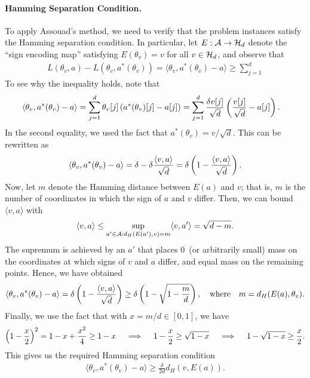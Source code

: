 \documentclass[12pt]{article}
\begin{document}
\paragraph{Hamming Separation Condition.} To apply Assouad's method, we need to verify that the problem instances satisfy the Hamming separation condition. In particular, let $E:{\cal A} \to {\cal H}_d$ denote the ``sign encoding map'' satisfying $E(\theta_v) = v$ for all $v \in {\cal H}_d$, and observe that 
\begin{align}
L(\theta_v, a) - L(\theta_v, a^*(\theta_v)) = \langle \theta_v, a^*(\theta_v) - a \rangle \geq \sum_{j=1}^d 
\end{align}
To see why the inequality holds, note that 
\begin{align}
\langle \theta_v, a^*(\theta_v) - a \rangle &= \sum_{j=1}^d \theta_v[j] \left( a^*(\theta_v)[j] - a[j] \right) 
 = \sum_{j=1}^d \frac{\delta v[j]}{\sqrt{d}} \left( \frac{v[j]}{\sqrt{d}} - a[j] \right). 
\end{align}
In the second equality, we used the fact that $a^*(\theta_v) = v/\sqrt{d}$. This can be rewritten as 
\begin{align}
\langle \theta_v, a^*(\theta_v) - a \rangle = \delta - \delta \frac{\langle v, a\rangle}{\sqrt{d}} = \delta \left( 1 - \frac{\langle v, a \rangle }{\sqrt{d}} \right). 
\end{align}
Now, let $m$ denote the Hamming distance between $E(a)$ and $v$; that is, $m$ is the number of coordinates in which the sign of $a$ and $v$ differ. Then, we can bound $\langle v, a \rangle$ with 
\begin{align}
\langle v, a \rangle \leq \sup_{a' \in {\cal A}: d_H(E(a'), v) = m} \langle v, a' \rangle = \sqrt{d -m}. 
\end{align}
The supremum is achieved by an $a'$ that places $0$~(or arbitrarily small) mass on the coordinates at which signs of $v$ and $a$ differ, and equal mass on the remaining points. Hence, we have obtained 
\begin{align}
\langle \theta_v, a^*(\theta_v) - a \rangle = \delta \left( 1 - \frac{\langle v, a \rangle }{\sqrt{d}} \right) \geq \delta \left( 1 - \sqrt{1 - \frac{m}{d}} \right), \quad \text{where} \quad m = d_H(E(a), \theta_v).  
\end{align}
Finally, we use the fact that with $x = m/d \in [0,1]$, we have 
\begin{align}
\left( 1 - \frac{x}{2} \right)^2 = 1 - x + \frac{x^2}{4} \geq 1 - x \quad \implies \quad 1 - \frac x 2 \geq \sqrt{1 - x} \quad \implies \quad 1 - \sqrt{1-x} \geq \frac{x}{2}.  
\end{align}
This gives us the required Hamming separation condition 
\begin{align}
\langle \theta_v, a^*(\theta_v) - a \rangle \geq \frac{\delta}{2d} d_H(v, E(a)). 
\end{align}
\end{document}
